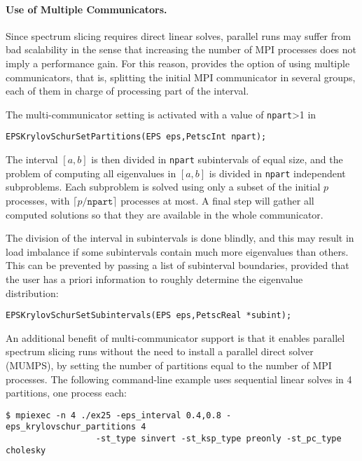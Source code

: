 \paragraph{Use of Multiple Communicators.}
Since spectrum slicing requires direct linear solves, parallel runs may suffer from bad scalability in the sense that increasing the number of MPI processes does not imply a performance gain. For this reason, \slepc provides the option of using multiple communicators, that is, splitting the initial MPI communicator in several groups, each of them in charge of processing part of the interval.

The multi-communicator setting is activated with a value of \texttt{npart}>1 in
	\begin{Verbatim}[fontsize=\small]
	EPSKrylovSchurSetPartitions(EPS eps,PetscInt npart);
	\end{Verbatim}
The interval $[a,b]$ is then divided in \texttt{npart} subintervals of equal size, and the problem of computing all eigenvalues in $[a,b]$ is divided in \texttt{npart} independent subproblems. Each subproblem is solved using only a subset of the initial $p$ processes, with $\lceil p/\texttt{npart}\rceil$ processes at most. A final step will gather all computed solutions so that they are available in the whole  communicator.

The division of the interval in subintervals is done blindly, and this may result in load imbalance if some subintervals contain much more eigenvalues than others. This can be prevented by passing a list of subinterval boundaries, provided that the user has a priori information to roughly determine the eigenvalue distribution:
	\begin{Verbatim}[fontsize=\small]
	EPSKrylovSchurSetSubintervals(EPS eps,PetscReal *subint);
	\end{Verbatim}

An additional benefit of multi-communicator support is that it enables parallel spectrum slicing runs without the need to install a parallel direct solver (MUMPS), by setting the number of partitions equal to the number of MPI processes. The following command-line example uses sequential linear solves in 4 partitions, one process each:
\begin{Verbatim}[fontsize=\small]
	$ mpiexec -n 4 ./ex25 -eps_interval 0.4,0.8 -eps_krylovschur_partitions 4
                  -st_type sinvert -st_ksp_type preonly -st_pc_type cholesky
\end{Verbatim}


